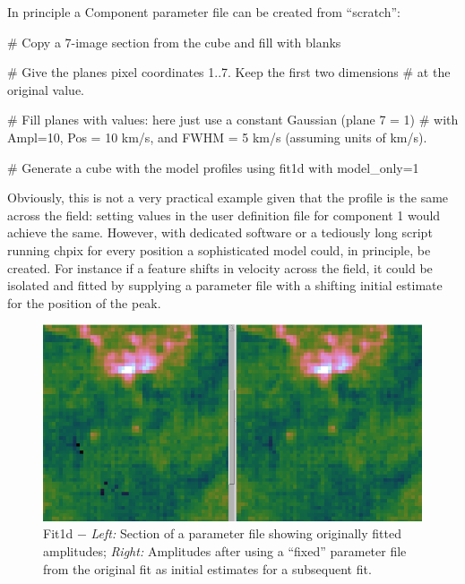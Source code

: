 \documentclass[oneside,11pt]{starlink}
\begin{document}
In principle a Component parameter file can be created from ``scratch'':
\begin{terminalv}
# Copy a 7-image section from the cube and fill with blanks

# Give the planes pixel coordinates 1..7. Keep the first two dimensions
# at the original value.

# Fill planes with values: here just use a constant Gaussian (plane 7 = 1)
# with Ampl=10, Pos = 10 km/s, and FWHM = 5 km/s (assuming units of km/s).

# Generate a cube with the model profiles using fit1d with model_only=1
\end{terminalv}

Obviously, this is not a very practical example given that the profile
is the same across the field: setting values in the user definition
file for component 1 would achieve the same. However, with dedicated
software or a tediously long script running chpix for every position a
sophisticated model could, in principle, be created. For instance if a
feature shifts in velocity across the field, it could be isolated and
fitted by supplying a parameter file with a shifting initial estimate
for the position of the peak.

\begin{figure}[htb]
  \begin{center}
    \includegraphics[width=0.8\linewidth]{sun258_fit1d_fixfit}
    \caption{Fit1d $-$  {\it Left:} Section of a parameter file showing
      originally fitted amplitudes; {\it Right:} Amplitudes after using a
      ``fixed'' parameter file from the original fit as initial estimates
      for a subsequent fit.}
    \label{fig:fixfit}
  \end{center}
\end{figure}
\end{document}

